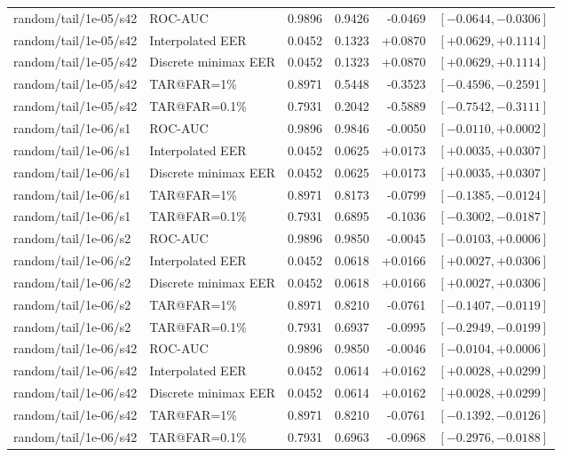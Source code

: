 \documentclass[journal]{IEEEtran}
\begin{document}
\begin{table}[!t]
\begin{tabular}{@{}llrrrr@{}}
random/tail/1e-05/s42 & ROC-AUC & 0.9896 & 0.9426 & -0.0469 & $[-0.0644,-0.0306]$ \\
random/tail/1e-05/s42 & Interpolated EER & 0.0452 & 0.1323 & +0.0870 & $[+0.0629,+0.1114]$ \\
random/tail/1e-05/s42 & Discrete minimax EER & 0.0452 & 0.1323 & +0.0870 & $[+0.0629,+0.1114]$ \\
random/tail/1e-05/s42 & TAR@FAR=1\% & 0.8971 & 0.5448 & -0.3523 & $[-0.4596,-0.2591]$ \\
random/tail/1e-05/s42 & TAR@FAR=0.1\% & 0.7931 & 0.2042 & -0.5889 & $[-0.7542,-0.3111]$ \\
random/tail/1e-06/s1 & ROC-AUC & 0.9896 & 0.9846 & -0.0050 & $[-0.0110,+0.0002]$ \\
random/tail/1e-06/s1 & Interpolated EER & 0.0452 & 0.0625 & +0.0173 & $[+0.0035,+0.0307]$ \\
random/tail/1e-06/s1 & Discrete minimax EER & 0.0452 & 0.0625 & +0.0173 & $[+0.0035,+0.0307]$ \\
random/tail/1e-06/s1 & TAR@FAR=1\% & 0.8971 & 0.8173 & -0.0799 & $[-0.1385,-0.0124]$ \\
random/tail/1e-06/s1 & TAR@FAR=0.1\% & 0.7931 & 0.6895 & -0.1036 & $[-0.3002,-0.0187]$ \\
random/tail/1e-06/s2 & ROC-AUC & 0.9896 & 0.9850 & -0.0045 & $[-0.0103,+0.0006]$ \\
random/tail/1e-06/s2 & Interpolated EER & 0.0452 & 0.0618 & +0.0166 & $[+0.0027,+0.0306]$ \\
random/tail/1e-06/s2 & Discrete minimax EER & 0.0452 & 0.0618 & +0.0166 & $[+0.0027,+0.0306]$ \\
random/tail/1e-06/s2 & TAR@FAR=1\% & 0.8971 & 0.8210 & -0.0761 & $[-0.1407,-0.0119]$ \\
random/tail/1e-06/s2 & TAR@FAR=0.1\% & 0.7931 & 0.6937 & -0.0995 & $[-0.2949,-0.0199]$ \\
random/tail/1e-06/s42 & ROC-AUC & 0.9896 & 0.9850 & -0.0046 & $[-0.0104,+0.0006]$ \\
random/tail/1e-06/s42 & Interpolated EER & 0.0452 & 0.0614 & +0.0162 & $[+0.0028,+0.0299]$ \\
random/tail/1e-06/s42 & Discrete minimax EER & 0.0452 & 0.0614 & +0.0162 & $[+0.0028,+0.0299]$ \\
random/tail/1e-06/s42 & TAR@FAR=1\% & 0.8971 & 0.8210 & -0.0761 & $[-0.1392,-0.0126]$ \\
random/tail/1e-06/s42 & TAR@FAR=0.1\% & 0.7931 & 0.6963 & -0.0968 & $[-0.2976,-0.0188]$ \\
\bottomrule
\end{tabular}
\end{table}
\end{document}
